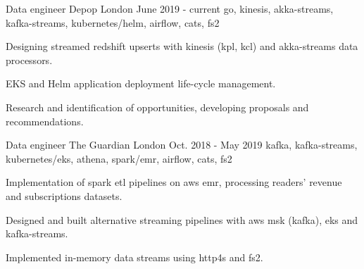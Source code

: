 

\begin{cventries}

  \cventry
    {Data engineer} %
    {\hspace{0.25em}Depop} %
    {London} %
    {June 2019 - current} %
    {go, kinesis, akka-streams, kafka-streams, kubernetes/helm, airflow, cats, fs2} %
    {
      \begin{cvitems} %
        \item {Designing streamed redshift upserts with kinesis (kpl, kcl) and akka-streams data processors.}
        \item {EKS and Helm application deployment life-cycle management.}
        \item {Research and identification of opportunities, developing proposals and recommendations.}
      \end{cvitems}
    }

  \cventry
    {Data engineer} %
    {\hspace{0.5em}The Guardian} %
    {London} %
    {Oct. 2018 - May 2019} %
    {kafka, kafka-streams, kubernetes/eks, athena, spark/emr, airflow, cats, fs2} %
    {
      \begin{cvitems} %
        \item {Implementation of spark etl pipelines on aws emr, processing readers' revenue and subscriptions datasets.}
        \item {Designed and built alternative streaming pipelines with aws msk (kafka), eks and kafka-streams.}
        \item {Implemented in-memory data streams using http4s and fs2.}
      \end{cvitems}
    }


\end{cventries}
